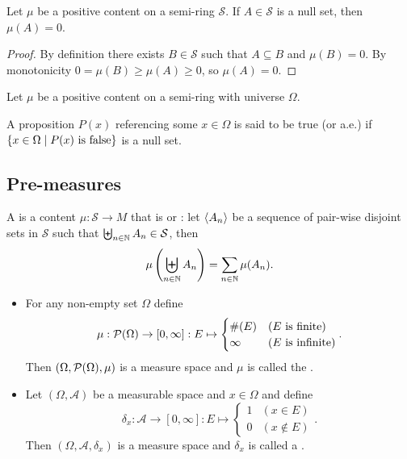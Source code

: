 \begin{lemma} \label{measureNullSet}
Let $\mu$ be a positive content on a semi-ring $\mathcal{S}$. If $A\in \mathcal{S}$ is a null set, then $\mu(A) = 0$.
\end{lemma}
\begin{proof}
By definition there exists $B\in\mathcal{S}$ such that $A\subseteq B$ and $\mu(B) = 0$. By monotonicity $0 = \mu(B)\geq \mu(A) \geq 0$, so $\mu(A) = 0$.
\end{proof}

\begin{definition}
Let $\mu$ be a positive content on a semi-ring with universe $\Omega$.

A proposition $P(x)$ referencing some $x\in\Omega$ is said to be true  (or a.e.) if $\setbuilder{x\in\Omega}{\text{$P(x)$ is false}}$ is a null set.
\end{definition}

\subsection{Pre-measures}
\begin{definition}
A  is a content $\mu:\mathcal{S} \to M$ that is  or : let $\left\langle A_n \right\rangle$ be a sequence of pair-wise disjoint sets in $\mathcal{S}$ such that $\biguplus_{n\in \mathbb{N}}A_n \in \mathcal{S}$, then
\[ \mu\left(\biguplus_{n\in\mathbb{N}}A_n\right) = \sum_{n\in\mathbb{N}}\mu(A_n). \]
\end{definition}

\begin{example}
\begin{itemize}
\item For any non-empty set $\Omega$ define
\[ \mu: \operatorname{\mathcal{P}}(\Omega)\to [0,\infty]: E\mapsto \begin{cases}
\#(E) & \text{($E$ is finite)} \\
\infty & \text{($E$ is infinite)}
\end{cases}. \]
Then $(\Omega, \operatorname{\mathcal{P}}(\Omega),\mu)$ is a measure space and $\mu$ is called the .
\item Let $(\Omega,\mathcal{A})$ be a measurable space and $x\in\Omega$ and define
\[ \delta_x: \mathcal{A}\to [0,\infty]: E\mapsto \begin{cases}
1 & (x\in E) \\ 0 & (x\notin E)
\end{cases}. \]
Then $(\Omega,\mathcal{A},\delta_x)$ is a measure space and $\delta_x$ is called a .
\end{itemize}
\end{example}

